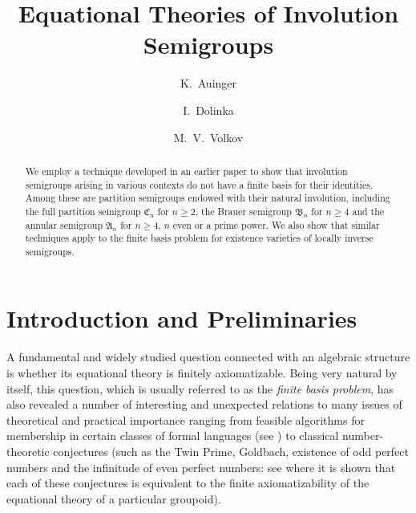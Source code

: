 \documentclass[11pt,reqno]{amsart}
\title[Equational Theories]{Equational Theories of Involution Semigroups}
\author{K.~Auinger}
\author{I.~Dolinka}
\author {M.~V.~Volkov}
\numberwithin{equation}{section}
\theoremstyle{remark}
\def\A{\mathfrak{A}}
\def\C{\mathfrak{C}}
\def\B{\mathfrak{B}}
\begin{document}
\begin{abstract}
We employ a technique developed in an earlier paper to show that involution
semigroups arising in various contexts do not have a finite basis for their identities. Among these are
partition semigroups endowed with their natural involution,
including the full partition semigroup $\C_n$ for $n\ge 2$, the
Brauer semigroup $\B_n$ for $n\ge 4$ and the annular semigroup
$\A_n$ for $n\ge 4$, $n$ even or a prime power. We also show that
similar techniques apply to the finite basis problem for existence
varieties of locally inverse semigroups.
\end{abstract}

\maketitle %

\section{Introduction and Preliminaries}
A fundamental and widely studied question connected with an
algebraic structure is whether its equational theory is finitely
axiomatizable. Being very natural by itself, this question, which
is usually referred to as the \emph{finite basis problem}, has
also revealed a number of interesting and unexpected relations to
many issues of theoretical and practical importance ranging from
feasible algorithms for membership in certain classes of formal
languages (see \cite{Alm95}) to classical number-theoretic
conjectures (such as the Twin Prime, Goldbach, existence of odd
perfect numbers and the infinitude of even perfect numbers: see
\cite{Per89} where it is shown that each of these conjectures is
equivalent to the finite axiomatizability of the equational theory
of a particular groupoid).
\end{document}
